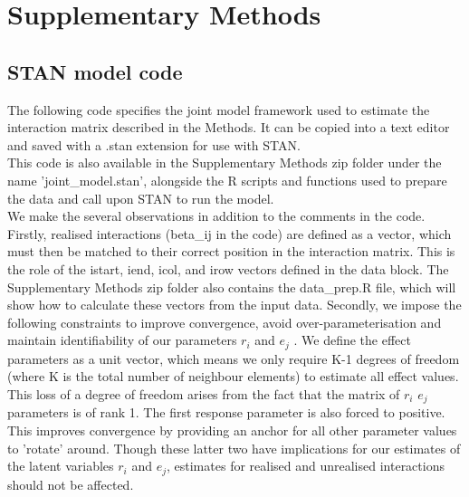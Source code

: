 \documentclass[a4,12pt]{article}
\begin{document}
\newpage 

\section{Supplementary Methods}

\setcounter{figure}{0}

\label{SI:Methods}

    \subsection{STAN model code}
    \label{SI:modelcode}
    The following code specifies the joint model framework used to estimate the interaction matrix described in the Methods. It can be copied into a text editor and saved with a .stan extension for use with STAN. \\

    This code is also available in the Supplementary Methods zip folder under the name 'joint\_model.stan', alongside the R scripts and functions used to prepare the data and call upon STAN to run the model. \\

    We make the several observations in addition to the comments in the code. Firstly, realised interactions (beta\_ij in the code) are defined as a vector, which must then be matched to their correct position in the interaction matrix. This is the role of the istart, iend, icol, and irow vectors defined in the data block. The Supplementary Methods zip folder also contains the data\_prep.R file, which will show how to calculate these vectors from the input data. 
    Secondly, we impose the following constraints to improve convergence, avoid over-parameterisation and maintain identifiability of our parameters $r_i$ and $e_j$ \parencite{Huber2004, Kidzinski2020, Niku2021}. We define the effect parameters as a unit vector, which means we only require K-1 degrees of freedom (where K is the total number of neighbour elements) to estimate all effect values. This loss of a degree of freedom arises from the fact that the matrix of $r_i$ $e_j$ parameters is of rank 1. The first response parameter is also forced to positive. This improves convergence by providing an anchor for all other parameter values to 'rotate' around. Though these latter two have implications for our estimates of the latent variables $r_i$ and $e_j$, estimates for realised and unrealised interactions should not be affected.

    
\end{document}
